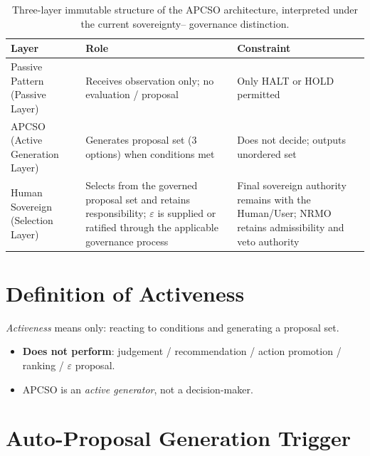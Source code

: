 \begin{table}[ht]
\centering
\small
\begin{tabularx}{\linewidth}{lXX}
\toprule
\textbf{Layer} & \textbf{Role} & \textbf{Constraint} \\
\midrule

Passive Pattern (Passive Layer)
& Receives observation only; no evaluation / proposal
& Only HALT or HOLD permitted \\

APCSO (Active Generation Layer)
& Generates proposal set (3 options) when conditions met
& Does not decide; outputs unordered set \\

Human Sovereign (Selection Layer)
& Selects from the governed proposal set and retains responsibility;
$\varepsilon$ is supplied or ratified through the applicable governance
process
& Final sovereign authority remains with the Human/User; NRMO retains
admissibility and veto authority \\

\bottomrule
\end{tabularx}
\caption[Parallel OODA layer roles]{Three-layer immutable structure
of the APCSO architecture, interpreted under the current sovereignty--
governance distinction.}
\label{tab:parallel-ooda-layers}
\end{table}

\section{Definition of Activeness}
\label{sec:parallel-ooda-activeness}

\textit{Activeness} means only: reacting to conditions and
generating a proposal set.

\begin{itemize}
\item \textbf{Does not perform}: judgement / recommendation /
action promotion / ranking / $\varepsilon$ proposal.
\item APCSO is an \emph{active generator}, not a decision-maker.
\end{itemize}

\section{Auto-Proposal Generation Trigger}
\label{sec:parallel-ooda-trigger}

